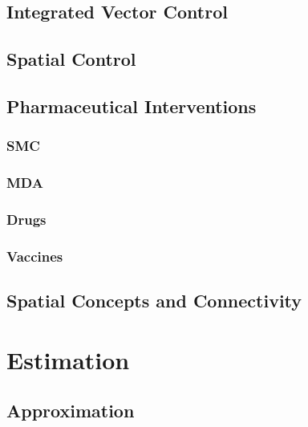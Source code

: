 \documentclass[
]{book}
\begin{document}
\hypertarget{integrated-vector-control-1}{%
\chapter{Integrated Vector Control}\label{integrated-vector-control-1}}

\hypertarget{spatial-control}{%
\chapter{Spatial Control}\label{spatial-control}}

\hypertarget{pharmaceutical-interventions-1}{%
\chapter{Pharmaceutical Interventions}\label{pharmaceutical-interventions-1}}

\hypertarget{smc-1}{%
\section{SMC}\label{smc-1}}

\hypertarget{mda-1}{%
\section{MDA}\label{mda-1}}

\hypertarget{drugs-1}{%
\section{Drugs}\label{drugs-1}}

\hypertarget{vaccines-1}{%
\section{Vaccines}\label{vaccines-1}}

\hypertarget{spatial-concepts-and-connectivity}{%
\chapter{Spatial Concepts and Connectivity}\label{spatial-concepts-and-connectivity}}

\hypertarget{part-estimation}{%
\part{Estimation}\label{part-estimation}}

\hypertarget{approximation}{%
\chapter{Approximation}\label{approximation}}
\end{document}
